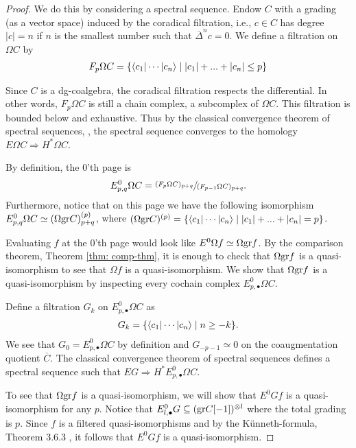 \documentclass[../thesis.tex]{subfiles}
\begin{document}
            \begin{proof}
                We do this by considering a spectral sequence. Endow $C$ with a grading (as a vector space) induced by the coradical filtration, i.e., $c\in C$ has degree $|c|=n$ if $n$ is the smallest number such that $\overline{\Delta}^nc = 0$. We define a filtration on $\Omega C$ by
                \begin{align*}
                    F_p\Omega C = \startset{\langle c_1 | \cdots | c_n \rangle \mid |c_1|+...+|c_n|\leq p}
                \end{align*}

                Since $C$ is a dg-coalgebra, the coradical filtration respects the differential. In other words, $F_p\Omega C$ is still a chain complex, a subcomplex of $\Omega C$. This filtration is bounded below and exhaustive. Thus by the classical convergence theorem of spectral sequences, \cite[Theorem 5.5.1][135]{Weibel94}, the spectral sequence converges to the homology $E\Omega C \Rightarrow H^*\Omega C$.

                By definition, the $0$'th page is 
                \begin{align*}
                    E^0_{p,q}\Omega C = \sfrac{(F_p\Omega C)_{p+q}}{(F_{p-1}\Omega C)_{p+q}}\tt{.}
                \end{align*}
                Furthermore, notice that on this page we have the following isomorphism $E^0_{p,q}\Omega C \simeq (\Omega \tt{gr}C)^{(p)}_{p+q}$, where $(\Omega \tt{gr}C)^{(p)} = \startset{\langle c_1 | \cdots | c_n \rangle \mid |c_1|+...+|c_n| = p}$.

                Evaluating $f$ at the $0$'th page would look like $E^0\Omega f \simeq \Omega \tt{gr}f$. By the comparison theorem, Theorem \ref{thm: comp-thm}, it is enough to check that $\Omega \tt{gr}f$ is a quasi-isomorphism to see that $\Omega f$ is a quasi-isomorphism. We show that $\Omega \tt{gr}f$ is a quasi-isomorphism by inspecting every cochain complex $E^0_{p,\bullet}\Omega C$.

                Define a filtration $G_k$ on $E^0_{p,\bullet}\Omega C$ as
                \begin{align*}
                    G_k = \startset{\langle c_1 | \cdots | c_n \rangle \mid n \geq -k}.
                \end{align*}
                We see that $G_0 = E^0_{p, \bullet}\Omega C$ by definition and $G_{-p-1} \simeq 0$ on the coaugmentation quotient $\overline{C}$. The classical convergence theorem of spectral sequences defines a spectral sequence such that $EG \Rightarrow H^*E^0_{p, \bullet}\Omega C$.

                To see that $\Omega \tt{gr}f$ is a quasi-isomorphism, we will show that $E^0Gf$ is a quasi-isomorphism for any $p$. Notice that $E^0_{l,\bullet}G \subseteq (\tt{gr}C[-1])^{\otimes l}$ where the total grading is $p$. Since $f$ is a filtered quasi-isomorphisms and by the K\"unneth-formula, Theorem 3.6.3 \cite[Theorem 3.6.3][88]{Weibel94}, it follows that $E^0Gf$ is a quasi-isomorphism.
            \end{proof}
\end{document}
